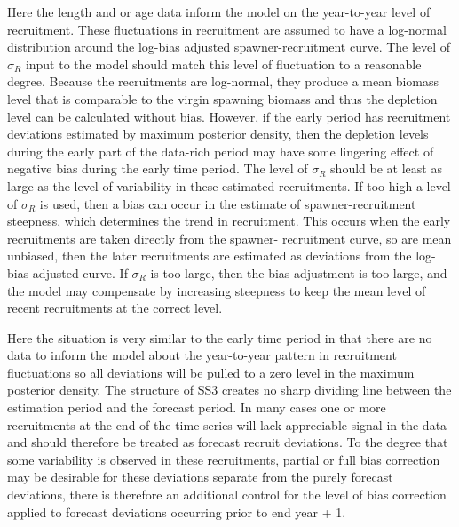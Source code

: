 Here the length and or age data inform the model on the year-to-year level of recruitment. These fluctuations in recruitment are assumed to have a log-normal distribution around the log-bias adjusted spawner-recruitment curve. The level of $\sigma_R$ input to the model should match this level of fluctuation to a reasonable degree. Because the recruitments are log-normal, they produce a mean biomass level that is comparable to the virgin spawning biomass and thus the depletion level can be calculated without bias. However, if the early period has recruitment deviations estimated by maximum posterior density, then the depletion levels during the early part of the data-rich period may have some lingering effect of negative bias during the early time period. The level of $\sigma_R$ should be at least as large as the level of variability in these estimated recruitments. If too high a level of $\sigma_R$ is used, then a bias can occur in the estimate of spawner-recruitment steepness, which determines the trend in recruitment. This occurs when the early recruitments are taken directly from the spawner- recruitment curve, so are mean unbiased, then the later recruitments are estimated as deviations from the log-bias adjusted curve. If $\sigma_R$ is too large, then the bias-adjustment is too large, and the model may compensate by increasing steepness to keep the mean level of recent recruitments at the correct level.

Here the situation is very similar to the early time period in that there are no data to inform the model about the year-to-year pattern in recruitment fluctuations so all deviations will be pulled to a zero level in the maximum posterior density. The structure of SS3 creates no sharp dividing line between the estimation period and the forecast period. In many cases one or more recruitments at the end of the time series will lack appreciable signal in the data and should therefore be treated as forecast recruit deviations. To the degree that some variability is observed in these recruitments, partial or full bias correction may be desirable for these deviations separate from the purely forecast deviations, there is therefore an additional control for the level of bias correction applied to forecast deviations occurring prior to end year + 1.

